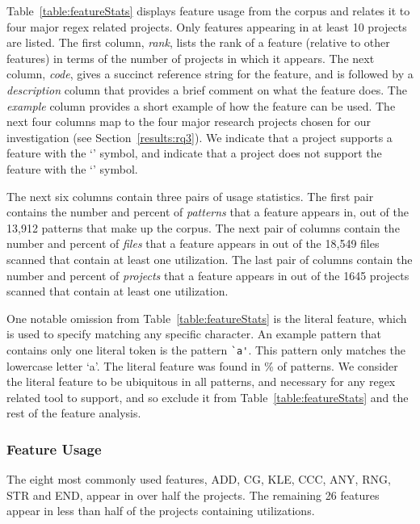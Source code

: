 Table~\ref{table:featureStats} displays feature usage from the corpus and relates it to four major regex related projects. Only features appearing in at least 10 projects are listed.
The first column, \emph{rank}, lists the rank of a feature (relative to other features) in terms of the number of projects in which it appears. The next column, \emph{code}, gives a succinct reference string for the feature, and is followed by a \emph{description} column that provides a brief comment on what the feature does.  The \emph{example} column provides a short example of how the feature can be used.
The next four columns map to the four major research projects chosen for our investigation (see Section~\ref{results:rq3}).  We indicate that a project supports a feature with the `\yes' symbol, and indicate that a project does not support the feature with the `\no' symbol.

The next six columns contain three pairs of usage statistics.  The first pair contains the number and percent of \emph{patterns} that a feature appears in, out of the 13,912 patterns that make up the corpus. The next pair of columns contain the number and percent of \emph{files} that a feature appears in out of the 18,549 files scanned that contain at least one utilization.  The last pair of columns contain the number and percent of \emph{projects} that a feature appears in out of the 1645 projects scanned that contain at least one utilization.

One notable omission from Table~\ref{table:featureStats} is the literal feature, which is used  to specify matching any specific character.  An example pattern that contains only one literal token is the pattern \verb!`a'!.  This pattern only matches the lowercase letter `a'.  The literal feature was found in \% of patterns.
We consider the literal feature to be ubiquitous in all patterns, and necessary for any regex related tool to support, and so exclude it from Table~\ref{table:featureStats} and the rest of the feature analysis.


\subsubsection{Feature Usage}
\label{sec:featureUsage}
The eight most commonly used features, ADD, CG, KLE, CCC, ANY, RNG, STR and END,
appear in over half the projects. The remaining 26 features appear in less than half of the projects containing utilizations.

